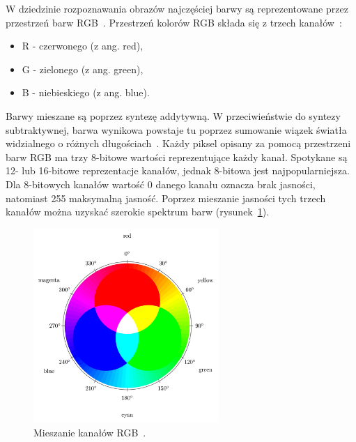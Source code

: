 \documentclass[a4paper,twoside,12pt]{book}
\begin{document}
    W dziedzinie rozpoznawania obrazów najczęściej barwy są reprezentowane przez przestrzeń barw
    RGB~\cite{przestrzenieKolorow}.
    Przestrzeń kolorów RGB składa się z trzech kanałów~\cite{kolory}:
    \begin{itemize}
        \item R - czerwonego (z ang. red),
        \item G - zielonego (z ang. green),
        \item B - niebieskiego (z ang. blue).
    \end{itemize}
%

    Barwy mieszane są poprzez syntezę addytywną.
    W przeciwieństwie do syntezy subtraktywnej, barwa wynikowa powstaje tu poprzez sumowanie wiązek światła widzialnego o
    różnych długościach~\cite{przestrzenieKolorow}.
    Każdy piksel opisany za pomocą przestrzeni barw RGB ma trzy 8-bitowe wartości reprezentujące każdy kanał.
    Spotykane
    są 12- lub 16-bitowe reprezentacje kanałów, jednak 8-bitowa jest najpopularniejsza.
    Dla 8-bitowych kanałów
    wartość 0
    danego kanału oznacza brak jasności, natomiast 255 maksymalną jasność.
    Poprzez mieszanie jasności tych trzech kanałów
    można uzyskać szerokie spektrum barw (rysunek~\ref{fig.mieszanieKolorow}).

    \begin{figure}[h!]
        \centering
        \includegraphics[width=7cm]{Obrazy/mieszanieKolorow.jpg}
        \caption{Mieszanie kanałów RGB~\cite{colorMixing}.}
        \label{fig.mieszanieKolorow}
    \end{figure}
\end{document}
